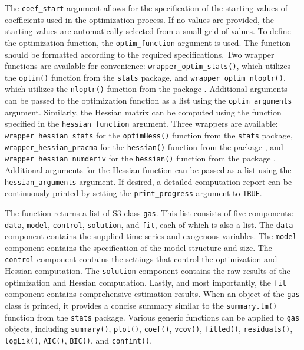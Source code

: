 The \texttt{coef\_start} argument allows for the specification of the starting values of coefficients used in the optimization process. If no values are provided, the starting values are automatically selected from a small grid of values. To define the optimization function, the \texttt{optim\_function} argument is used. The function should be formatted according to the required specifications. Two wrapper functions are available for convenience: \texttt{wrapper\_optim\_stats()}, which utilizes the \texttt{optim()} function from the \texttt{stats} package, and \texttt{wrapper\_optim\_nloptr()}, which utilizes the \texttt{nloptr()} function from the  package \citep{Ypma2020}. Additional arguments can be passed to the optimization function as a list using the \texttt{optim\_arguments} argument. Similarly, the Hessian matrix can be computed using the function specified in the \texttt{hessian\_function} argument. Three wrappers are available: \texttt{wrapper\_hessian\_stats} for the \texttt{optimHess()} function from the \texttt{stats} package, \texttt{wrapper\_hessian\_pracma} for the \texttt{hessian()} function from the  package \citep{Borchers2023}, and \texttt{wrapper\_hessian\_numderiv} for the \texttt{hessian()} function from the  package \citep{Gilbert2022}. Additional arguments for the Hessian function can be passed as a list using the \texttt{hessian\_arguments} argument. If desired, a detailed computation report can be continuously printed by setting the \texttt{print\_progress} argument to \texttt{TRUE}.

The function returns a list of S3 class \texttt{gas}. This list consists of five components: \texttt{data}, \texttt{model}, \texttt{control}, \texttt{solution}, and \texttt{fit}, each of which is also a list. The \texttt{data} component contains the supplied time series and exogenous variables. The \texttt{model} component contains the specification of the model structure and size. The \texttt{control} component contains the settings that control the optimization and Hessian computation. The \texttt{solution} component contains the raw results of the optimization and Hessian computation. Lastly, and most importantly, the \texttt{fit} component contains comprehensive estimation results. When an object of the \texttt{gas} class is printed, it provides a concise summary similar to the \texttt{summary.lm()} function from the \texttt{stats} package. Various generic functions can be applied to \texttt{gas} objects, including \texttt{summary()}, \texttt{plot()}, \texttt{coef()}, \texttt{vcov()}, \texttt{fitted()}, \texttt{residuals()}, \texttt{logLik()}, \texttt{AIC()}, \texttt{BIC()}, and \texttt{confint()}.

